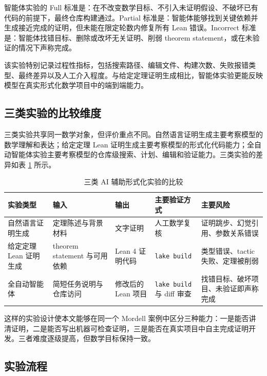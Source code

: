 智能体实验的 Full 标准是：在不改变数学目标、不引入未证明假设、不破坏已有代码的前提下，最终仓库构建通过。Partial 标准是：智能体能够找到关键依赖并生成接近完成的证明，但未能在限定轮数内修复所有 Lean 错误。Incorrect 标准是：智能体找错目标、删除或改坏无关证明、削弱 theorem statement，或在未验证的情况下声称完成。

该实验特别记录过程性指标，包括搜索路径、编辑文件、构建次数、失败报错类型、最终差异以及人工介入程度。与给定定理证明生成相比，智能体实验更能反映模型在真实形式化数学项目中的端到端能力。

\subsection{三类实验的比较维度}

三类实验共享同一数学对象，但评价重点不同。自然语言证明生成主要考察模型的数学理解和表达；给定定理 Lean 证明生成主要考察模型的形式化代码能力；全自动智能体实验主要考察模型的仓库级搜索、计划、编辑和验证能力。三类实验的差异如表 \ref{tab:three-ai-experiments} 所示。

\begin{table}[H]
\centering
\scriptsize
\caption{三类 AI 辅助形式化实验的比较}
\label{tab:three-ai-experiments}
\begin{tabular}{@{}p{}p{}p{}p{}p{}@{}}
\toprule
\textbf{实验类型} & \textbf{输入} & \textbf{输出} & \textbf{主要验证方式} & \textbf{主要风险} \\
\midrule
自然语言证明生成 & 定理陈述与背景材料 & 文字证明 & 人工数学复核 & 证明跳步、幻觉引用、参数关系错误 \\
给定定理 Lean 证明生成 & theorem statement 与可用依赖 & Lean 4 证明代码 & \texttt{lake build} & 类型错误、tactic 失败、定理被削弱 \\
全自动智能体 & 简短任务说明与仓库访问 & 修改后的 Lean 项目 & \texttt{lake build} 与 diff 审查 & 找错目标、破坏项目、未验证即声称完成 \\
\bottomrule
\end{tabular}
\end{table}

这样的实验设计使本文能够在同一个 Mordell 案例中区分三种能力：一是能否讲清证明，二是能否写出机器可检查证明，三是能否在真实项目中自主完成证明开发。三者难度逐级提高，但数学目标保持一致。

\subsection{实验流程}

